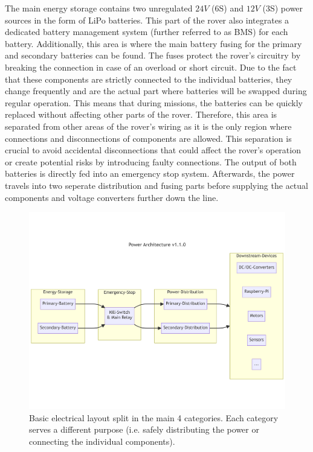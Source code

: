     The main energy storage contains two unregulated $24V$ (6S) and $12V$ (3S) power sources in the form of LiPo batteries. This part of the rover also integrates a dedicated battery management system (further referred to as BMS) for each battery. Additionally, this area is where the main battery fusing for the primary and secondary batteries can be found. The fuses protect the rover's circuitry by breaking the connection in case of an overload or short circuit. Due to the fact that these components are strictly connected to the individual batteries, they change frequently and are the actual part where batteries will be swapped during regular operation. This means that during missions, the batteries can be quickly replaced without affecting other parts of the rover. Therefore, this area is separated from other areas of the rover's wiring as it is the only region where connections and disconnections of components are allowed. This separation is crucial to avoid accidental disconnections that could affect the rover's operation or create potential risks by introducing faulty connections. The output of both batteries is directly fed into an emergency stop system. Afterwards, the power travels into two seperate distribution and fusing parts before supplying the actual components and voltage converters further down the line.
    
    \begin{figure}[h]
    \includegraphics[width=\textwidth]{contents/figures/power-architecture-v1.1.0.png}
    \caption{Basic electrical layout split in the main 4 categories. Each category serves a different purpose (i.e. safely distributing the power or connecting the individual components).}
    \label{power_architecture}
    \end{figure}
    
